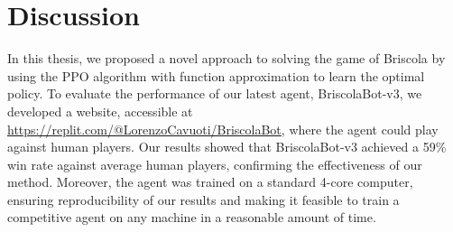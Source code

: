 \chapter{Discussion}
In this thesis, we proposed a novel approach to solving the game of Briscola by using the PPO algorithm with function approximation to learn the optimal policy. To evaluate the performance of our latest agent, BriscolaBot-v3, we developed a website, accessible at \url{https://replit.com/@LorenzoCavuoti/BriscolaBot}, where the agent could play against human players. Our results showed that BriscolaBot-v3 achieved a 59\% win rate against average human players, confirming the effectiveness of our method. Moreover, the agent was trained on a standard 4-core computer, ensuring reproducibility of our results and making it feasible to train a competitive agent on any machine in a reasonable amount of time.

